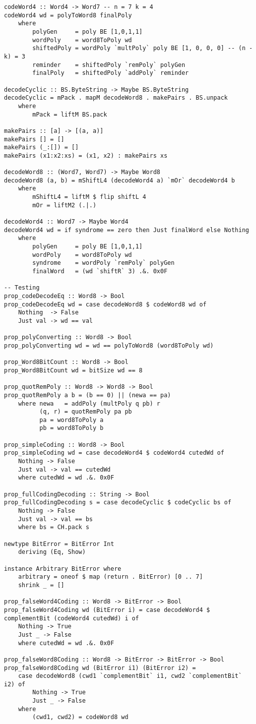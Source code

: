 \documentclass[russian,utf8,simple,emptystyle]{eskdtext}
\begin{document}
\begin{lstlisting}
codeWord4 :: Word4 -> Word7 -- n = 7 k = 4 
codeWord4 wd = polyToWord8 finalPoly
    where
        polyGen     = poly BE [1,0,1,1]
        wordPoly    = word8ToPoly wd
        shiftedPoly = wordPoly `multPoly` poly BE [1, 0, 0, 0] -- (n - k) = 3
        reminder    = shiftedPoly `remPoly` polyGen
        finalPoly   = shiftedPoly `addPoly` reminder

decodeCyclic :: BS.ByteString -> Maybe BS.ByteString
decodeCyclic = mPack . mapM decodeWord8 . makePairs . BS.unpack
    where
        mPack = liftM BS.pack

makePairs :: [a] -> [(a, a)]
makePairs [] = []
makePairs (_:[]) = []
makePairs (x1:x2:xs) = (x1, x2) : makePairs xs

decodeWord8 :: (Word7, Word7) -> Maybe Word8 
decodeWord8 (a, b) = mShiftL4 (decodeWord4 a) `mOr` decodeWord4 b
    where
        mShiftL4 = liftM $ flip shiftL 4
        mOr = liftM2 (.|.)

decodeWord4 :: Word7 -> Maybe Word4 
decodeWord4 wd = if syndrome == zero then Just finalWord else Nothing
    where
        polyGen     = poly BE [1,0,1,1]
        wordPoly    = word8ToPoly wd
        syndrome    = wordPoly `remPoly` polyGen
        finalWord   = (wd `shiftR` 3) .&. 0x0F

-- Testing
prop_codeDecodeEq :: Word8 -> Bool
prop_codeDecodeEq wd = case decodeWord8 $ codeWord8 wd of
    Nothing  -> False
    Just val -> wd == val

prop_polyConverting :: Word8 -> Bool 
prop_polyConverting wd = wd == polyToWord8 (word8ToPoly wd)

prop_Word8BitCount :: Word8 -> Bool
prop_Word8BitCount wd = bitSize wd == 8

prop_quotRemPoly :: Word8 -> Word8 -> Bool
prop_quotRemPoly a b = (b == 0) || (newa == pa)
    where newa   = addPoly (multPoly q pb) r
          (q, r) = quotRemPoly pa pb
          pa = word8ToPoly a 
          pb = word8ToPoly b

prop_simpleCoding :: Word8 -> Bool
prop_simpleCoding wd = case decodeWord4 $ codeWord4 cutedWd of
    Nothing -> False
    Just val -> val == cutedWd
    where cutedWd = wd .&. 0x0F

prop_fullCodingDecoding :: String -> Bool
prop_fullCodingDecoding s = case decodeCyclic $ codeCyclic bs of
    Nothing -> False
    Just val -> val == bs 
    where bs = CH.pack s

newtype BitError = BitError Int 
    deriving (Eq, Show)

instance Arbitrary BitError where
    arbitrary = oneof $ map (return . BitError) [0 .. 7]
    shrink _ = []

prop_falseWord4Coding :: Word8 -> BitError -> Bool
prop_falseWord4Coding wd (BitError i) = case decodeWord4 $ complementBit (codeWord4 cutedWd) i of 
    Nothing -> True
    Just _ -> False 
    where cutedWd = wd .&. 0x0F

prop_falseWord8Coding :: Word8 -> BitError -> BitError -> Bool
prop_falseWord8Coding wd (BitError i1) (BitError i2) = 
    case decodeWord8 (cwd1 `complementBit` i1, cwd2 `complementBit` i2) of
        Nothing -> True
        Just _ -> False
    where 
        (cwd1, cwd2) = codeWord8 wd
\end{lstlisting}
\end{document}
